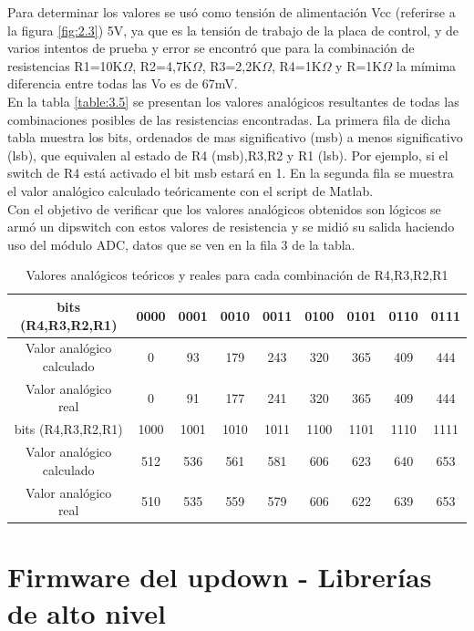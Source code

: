 Para determinar los valores se usó como tensión de alimentación Vcc (referirse a la figura \ref{fig:2.3}) 5V, ya que es la tensión de trabajo de la placa de control, y de varios intentos de prueba y error se encontró que para la combinación de resistencias R1=10K\(\Omega\), R2=4,7K\(\Omega\), R3=2,2K\(\Omega\), R4=1K\(\Omega\) y R=1K\(\Omega\) la mímima diferencia entre todas las Vo es de 67mV.\\
En la tabla \ref{table:3.5} se presentan los valores analógicos resultantes de todas las combinaciones posibles de las resistencias encontradas. La primera fila de dicha tabla muestra los bits, ordenados de mas significativo (msb) a menos significativo (lsb), que equivalen al estado de R4 (msb),R3,R2 y R1 (lsb). Por ejemplo, si el switch de R4 está activado el bit msb estará en 1. En la segunda fila se muestra el valor analógico calculado teóricamente con el script de Matlab.\\
Con el objetivo de verificar que los valores analógicos obtenidos son lógicos se armó un dipswitch con estos valores de resistencia y se midió su salida haciendo uso del módulo ADC, datos que se ven en la fila 3 de la tabla.

\begin{table}[!ht]
	\begin{center}
		\begin{tabular}{|c|c|c|c|c|c|c|c|c|}
			\hline
			\rowcolor{OODlightblue}
			bits (R4,R3,R2,R1) & 0000 & 0001 & 0010 & 0011 & 0100 & 0101 & 0110 & 0111  \\
			\hline
			Valor analógico calculado & 0 & 93 & 179 & 243 & 320 & 365 & 409 & 444 \\
			\hline
			Valor analógico real  & 0 & 91 & 177 & 241 & 320 & 365 & 409 & 444 \\
			\hline \hline
			\rowcolor{OODlightblue}
			bits (R4,R3,R2,R1) & 1000 & 1001 & 1010 & 1011 & 1100 & 1101 & 1110 & 1111  \\
			\hline
			Valor analógico calculado & 512  & 536  & 561  & 581  & 606  & 623  & 640  & 653  \\
			\hline
			Valor analógico real & 510  & 535  & 559  & 579  & 606  & 622  & 639  & 653 \\
			\hline
		\end{tabular}
	\end{center}
	\caption{Valores analógicos teóricos y reales para cada combinación de R4,R3,R2,R1}
	\label{table:\thetable}
\end{table}

\section{Firmware del updown - Librerías de alto nivel} \label{sec:\thesection}

